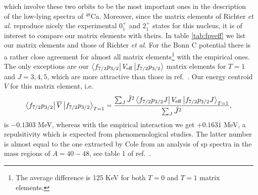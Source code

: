 which involve these two orbits to be the most important ones in the
description of the low-lying spectra of $^{48}$Ca. Moreover, since the
matrix elements of Richter {\em et al.} \cite{richt91}
reproduce nicely the experimental
$0_1^+$ and $2_1^+$ states for this nucleus, it is of interest to compare
our matrix elements with theirs. In table \ref{tab:fpveff} we list
our matrix elements and those of Richter {\em et al.} For the Bonn C potential
there is a rather close agreement for almost all matrix elements\footnote{The average
difference is 125 KeV for both $T=0$ and $T=1$ matrix elements.}
with the empirical ones. The only exceptions are
our $\left\langle f_{7/2}p_{3/2} \right|V_{\mathrm{eff}}\left| f_{7/2}p_{3/2} \right\rangle$
matrix elements for $T=1$ and $J=3,4,5$, which
are more attractive  than those in ref.\ \cite{richt91}. Our energy centroid
$\overline{V}$ for
this matrix element, i.e.\
\[
\left\langle f_{7/2}p_{3/2} \right|\overline{V}\left| f_{7/2}p_{3/2} \right\rangle_{T=1}
=\frac{\sum_{J}\hat{J}^2
 \left\langle f_{7/2}p_{3/2}J \right|V_{\mathrm{eff}}\left| f_{7/2}p_{3/2}J \right\rangle_{T=1}}
  {\sum_{J}\hat{J}^2},
\]
is $-0.1303$ MeV, whereas with the empirical interaction we get
$+0.1631$ MeV,
a repulsitivity which is expected from phenomenological studies. The latter
number is almost equal to the one extracted by Cole \cite{cole91}
from an analysis of sp spectra in the mass regions of $A=40-48$, see table
1 of ref.\ \cite{cole91}.

